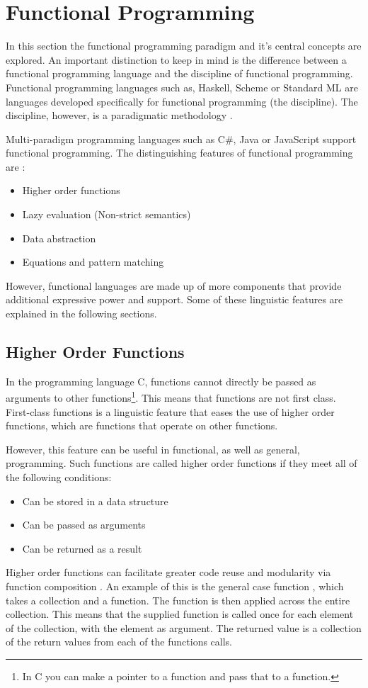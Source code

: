 \section{Functional Programming} \label{sec:functional-programming}
In this section the functional programming paradigm and it's central concepts are explored. An important distinction to keep in mind is the difference between a functional programming language and the discipline of functional programming. Functional programming languages such as, Haskell, Scheme or Standard ML are languages developed specifically for functional programming (the discipline). The discipline, however, is a paradigmatic methodology \cite{benton2016improving}.

Multi-paradigm programming languages such as C\#, Java or JavaScript support functional programming. The distinguishing features of functional programming are \cite{hudak1989conception}:
\begin{itemize}
    \item Higher order functions
    \item Lazy evaluation (Non-strict semantics)
    \item Data abstraction
    \item Equations and pattern matching
\end{itemize}

However, functional languages are made up of more components that provide additional expressive power and support. Some of these linguistic features are explained in the following sections.

\subsection{Higher Order Functions}
In the programming language C, functions cannot directly be passed as arguments to other functions\footnote{In C you can make a pointer to a function and pass that to a function.}. This means that functions are not first class. First-class functions is a linguistic feature that eases the use of higher order functions, which are functions that operate on other functions.

However, this feature can be useful in functional, as well as general, programming. Such functions are called higher order functions if they meet all of the following conditions:
\begin{itemize}
    \item Can be stored in a data structure
    \item Can be passed as arguments
    \item Can be returned as a result
\end{itemize}
Higher order functions can facilitate greater code reuse and modularity via function composition \cite{hughes1989functional}. An example of this is the general case function , which takes a collection and a function. The function is then applied across the entire collection. This means that the supplied function is called once for each element of the collection, with the element as argument. The returned value is a collection of the return values from each of the functions calls.

